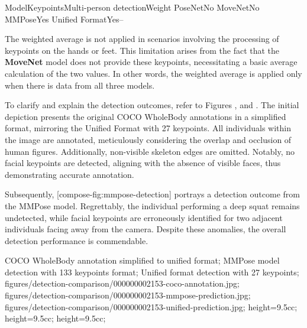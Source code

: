     \setupTABLE[r][1][style=bold]
    \setupTABLE[c][each][offset=3dd]
    \setupTABLE[frame=off]
    \setupTABLE[r][1][topframe=on,bottomframe=on]
    \setupTABLE[c][each][leftframe=on]
    \setupTABLE[c][1][leftframe=off]
    \setupTABLE[c][2,3,4][align=middle]
    \bTR\bTD Model\eTD\bTD              Keypoints\eTD\bTD  Multi-person detection\eTD\bTD  Weight\eTD\eTR
    \bTR\bTD PoseNet\eTD{}\eTD\bTD         No\eTD{}\eTD\eTR
    \bTR\bTD MoveNet\eTD{}\eTD\bTD         No\eTD{}\eTD\eTR
    \bTR\bTD MMPose\eTD{}\eTD\bTD        Yes\eTD{}\eTD\eTR
    \bTR\bTD Unified Format\eTD{}\eTD\bTD         Yes\eTD\bTD                     --\eTD\eTR


The weighted average is not applied in scenarios involving the processing of keypoints on the hands or feet. This limitation arises from the fact that the {\bf MoveNet} model does not provide these keypoints, necessitating a basic average calculation of the two values. In other words, the weighted average is applied only when there is data from all three models.

To clarify and explain the detection outcomes, refer to Figures ,  and . The initial depiction presents the original COCO WholeBody annotations in a simplified format, mirroring the Unified Format with 27 keypoints. All individuals within the image are annotated, meticulously considering the overlap and occlusion of human figures. Additionally, non-visible skeleton edges are omitted. Notably, no facial keypoints are detected, aligning with the absence of visible faces, thus demonstrating accurate annotation.

Subsequently, [compose-fig:mmpose-detection] portrays a detection outcome from the MMPose model. Regrettably, the individual performing a deep squat remains undetected, while facial keypoints are erroneously identified for two adjacent individuals facing away from the camera. Despite these anomalies, the overall detection performance is commendable.

    {
        COCO WholeBody annotation simplified to unified format;
        MMPose model detection with 133 keypoints format;
        Unified format detection with 27 keypoints;
    }
    {
        figures/detection-comparison/000000002153-coco-annotation.jpg;
        figures/detection-comparison/000000002153-mmpose-prediction.jpg;
        figures/detection-comparison/000000002153-unified-prediction.jpg;
    }
    {
        height=9.5cc;
        height=9.5cc;
        height=9.5cc;
    }

